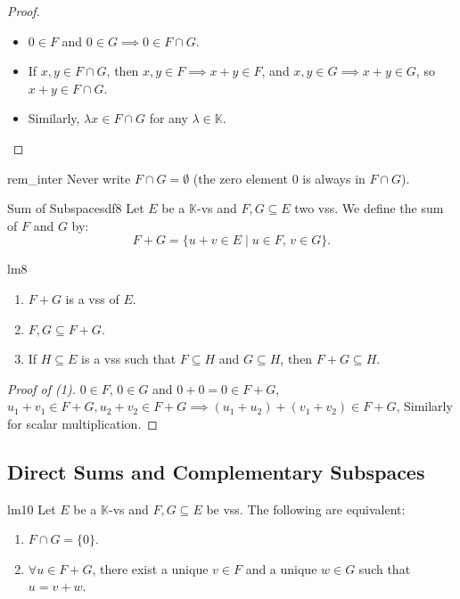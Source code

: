 \documentclass[11pt, a4paper]{article}
\newcommand{\K}{\mathbb{K}}
\begin{document}
\begin{proof}
  \begin{itemize}
    \item $0 \in F$ and $0 \in G \implies 0 \in F \cap G$.
    \item If $x, y \in F \cap G$, then $x, y \in F \implies x + y \in F$, and $x, y \in G \implies x + y \in G$, so $x + y \in F \cap G$.
    \item Similarly, $\lambda x \in F \cap G$ for any $\lambda \in \K$.
  \end{itemize}
\end{proof}

\begin{remark}{}{rem_inter}
  Never write $F \cap G = \emptyset$ (the zero element $0$ is always in $F \cap G$).
\end{remark}

\begin{definition}{Sum of Subspaces}{df8}
  Let $E$ be a $\K$-vs and $F, G \subseteq E$ two vss. We define the sum of $F$ and $G$ by:
  \[
    F + G = \{u + v \in E \mid u \in F, \, v \in G\}.
  \]
\end{definition}

\begin{lemma}{}{lm8}
  \begin{enumerate}
    \item $F + G$ is a vss of $E$.
    \item $F, G \subseteq F + G$.
    \item If $H \subseteq E$ is a vss such that $F \subseteq H$ and $G \subseteq H$, then $F + G \subseteq H$.
  \end{enumerate}
\end{lemma}

\begin{proof}[Proof of (1)]
    $0 \in F$, $0 \in G$ and $0 + 0 = 0 \in F + G$,
    $u_1 + v_1 \in F + G, u_2 + v_2 \in F + G \implies (u_1 + u_2) + (v_1 + v_2) \in F + G$,
    Similarly for scalar multiplication.
\end{proof}

\subsection{Direct Sums and Complementary Subspaces}

\begin{lemma}{}{lm10}
  Let $E$ be a $\K$-vs and $F, G \subseteq E$ be vss. The following are equivalent:
  \begin{enumerate}
    \item $F \cap G = \{0\}$.
    \item $\forall u \in F + G$, there exist a unique $v \in F$ and a unique $w \in G$ such that $u = v + w$.
  \end{enumerate}
\end{lemma}
\end{document}
